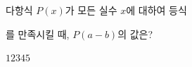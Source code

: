다항식 $P(x)$가 모든 실수 $x$에 대하여 등식 \par\smallskip{}\par\smallskip\noindent 를 만족시킬 때, $P(a-b)$의 값은? 
\begin{choices32}{$1$}{$2$}{$3$}{$4$}{$5$}\end{choices32}

